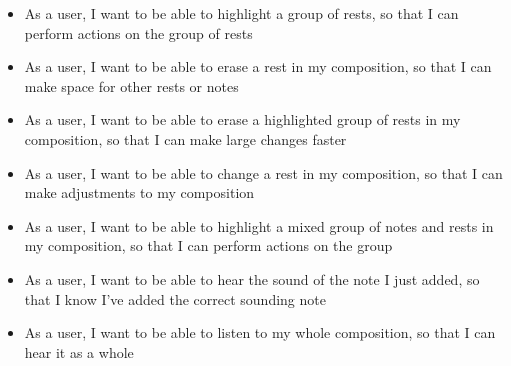 \begin{itemize}
    \item As a user, I want to be able to highlight a group of rests, so that I can perform actions on the group of rests
    \item As a user, I want to be able to erase a rest in my composition, so that I can make space for other rests or notes
    \item As a user, I want to be able to erase a highlighted group of rests in my composition, so that I can make large changes faster
    \item As a user, I want to be able to change a rest in my composition, so that I can make adjustments to my composition
    \item As a user, I want to be able to highlight a mixed group of notes and rests in my composition, so that I can perform actions on the group
    \item As a user, I want to be able to hear the sound of the note I just added, so that I know I've added the correct sounding note
    \item As a user, I want to be able to listen to my whole composition, so that I can hear it as a whole

\end{itemize}

